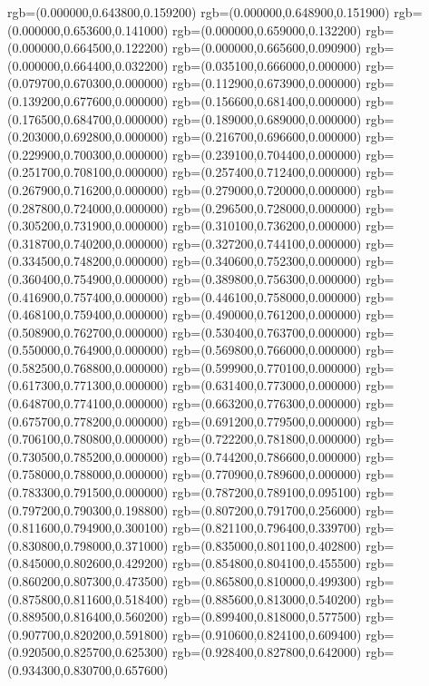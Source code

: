 {{		rgb=(0.000000,0.643800,0.159200)
		rgb=(0.000000,0.648900,0.151900)
		rgb=(0.000000,0.653600,0.141000)
		rgb=(0.000000,0.659000,0.132200)
		rgb=(0.000000,0.664500,0.122200)
		rgb=(0.000000,0.665600,0.090900)
		rgb=(0.000000,0.664400,0.032200)
		rgb=(0.035100,0.666000,0.000000)
		rgb=(0.079700,0.670300,0.000000)
		rgb=(0.112900,0.673900,0.000000)
		rgb=(0.139200,0.677600,0.000000)
		rgb=(0.156600,0.681400,0.000000)
		rgb=(0.176500,0.684700,0.000000)
		rgb=(0.189000,0.689000,0.000000)
		rgb=(0.203000,0.692800,0.000000)
		rgb=(0.216700,0.696600,0.000000)
		rgb=(0.229900,0.700300,0.000000)
		rgb=(0.239100,0.704400,0.000000)
		rgb=(0.251700,0.708100,0.000000)
		rgb=(0.257400,0.712400,0.000000)
		rgb=(0.267900,0.716200,0.000000)
		rgb=(0.279000,0.720000,0.000000)
		rgb=(0.287800,0.724000,0.000000)
		rgb=(0.296500,0.728000,0.000000)
		rgb=(0.305200,0.731900,0.000000)
		rgb=(0.310100,0.736200,0.000000)
		rgb=(0.318700,0.740200,0.000000)
		rgb=(0.327200,0.744100,0.000000)
		rgb=(0.334500,0.748200,0.000000)
		rgb=(0.340600,0.752300,0.000000)
		rgb=(0.360400,0.754900,0.000000)
		rgb=(0.389800,0.756300,0.000000)
		rgb=(0.416900,0.757400,0.000000)
		rgb=(0.446100,0.758000,0.000000)
		rgb=(0.468100,0.759400,0.000000)
		rgb=(0.490000,0.761200,0.000000)
		rgb=(0.508900,0.762700,0.000000)
		rgb=(0.530400,0.763700,0.000000)
		rgb=(0.550000,0.764900,0.000000)
		rgb=(0.569800,0.766000,0.000000)
		rgb=(0.582500,0.768800,0.000000)
		rgb=(0.599900,0.770100,0.000000)
		rgb=(0.617300,0.771300,0.000000)
		rgb=(0.631400,0.773000,0.000000)
		rgb=(0.648700,0.774100,0.000000)
		rgb=(0.663200,0.776300,0.000000)
		rgb=(0.675700,0.778200,0.000000)
		rgb=(0.691200,0.779500,0.000000)
		rgb=(0.706100,0.780800,0.000000)
		rgb=(0.722200,0.781800,0.000000)
		rgb=(0.730500,0.785200,0.000000)
		rgb=(0.744200,0.786600,0.000000)
		rgb=(0.758000,0.788000,0.000000)
		rgb=(0.770900,0.789600,0.000000)
		rgb=(0.783300,0.791500,0.000000)
		rgb=(0.787200,0.789100,0.095100)
		rgb=(0.797200,0.790300,0.198800)
		rgb=(0.807200,0.791700,0.256000)
		rgb=(0.811600,0.794900,0.300100)
		rgb=(0.821100,0.796400,0.339700)
		rgb=(0.830800,0.798000,0.371000)
		rgb=(0.835000,0.801100,0.402800)
		rgb=(0.845000,0.802600,0.429200)
		rgb=(0.854800,0.804100,0.455500)
		rgb=(0.860200,0.807300,0.473500)
		rgb=(0.865800,0.810000,0.499300)
		rgb=(0.875800,0.811600,0.518400)
		rgb=(0.885600,0.813000,0.540200)
		rgb=(0.889500,0.816400,0.560200)
		rgb=(0.899400,0.818000,0.577500)
		rgb=(0.907700,0.820200,0.591800)
		rgb=(0.910600,0.824100,0.609400)
		rgb=(0.920500,0.825700,0.625300)
		rgb=(0.928400,0.827800,0.642000)
		rgb=(0.934300,0.830700,0.657600)
}}
